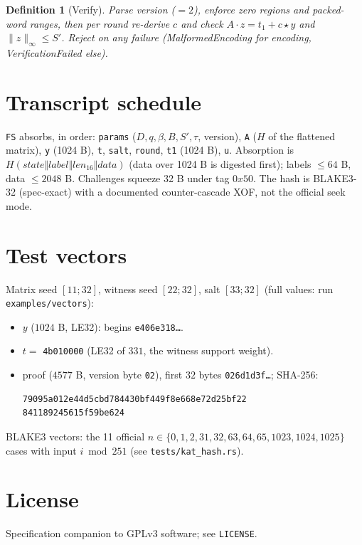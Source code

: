 \documentclass[11pt,a4paper]{article}
\newtheorem{definition}{Definition}[section]
\begin{document}
\begin{definition}[Verify]
Parse version ($=2$), enforce zero regions and packed-word ranges, then per
round re-derive $c$ and check $A\cdot z = t_1 + c\star y$ and
$\lVert z\rVert_\infty \le S'$. Reject on any failure
(\textsf{MalformedEncoding} for encoding, \textsf{VerificationFailed} else).
\end{definition}

\section{Transcript schedule}

\texttt{FS} absorbs, in order: \texttt{params} ($D,q,\beta,B,S',\tau$,
version), \texttt{A} ($H$ of the flattened matrix), \texttt{y} (1024 B),
\texttt{t}, \texttt{salt}, \texttt{round}, \texttt{t1} (1024 B),
\texttt{u}. Absorption is $H(\mathit{state}\Vert\mathit{label}\Vert
\mathit{len}_{16}\Vert\mathit{data})$ (data over 1024 B is digested first);
labels $\le 64$ B, data $\le 2048$ B. Challenges squeeze 32 B under tag
$0x50$. The hash is BLAKE3-32 (spec-exact) with a documented
counter-cascade XOF, not the official seek mode.

\section{Test vectors}

Matrix seed $[11;32]$, witness seed $[22;32]$, salt $[33;32]$
(full values: run \texttt{examples/vectors}):
\begin{itemize}
\item $y$ ($1024$ B, LE32): begins \texttt{e406e318\ldots}.
\item $t = $ \texttt{4b010000} (LE32 of $331$, the witness support weight).
\item proof ($4577$ B, version byte \texttt{02}),
  first $32$ bytes \texttt{026d1d3f\ldots}; SHA-256:
{\footnotesize\begin{verbatim}79095a012e44d5cbd784430bf449f8e668e72d25bf22
841189245615f59be624\end{verbatim}}
\end{itemize}
BLAKE3 vectors: the 11 official $n \in \{0,1,2,31,32,63,64,65,1023,1024,
1025\}$ cases with input $i \bmod 251$ (see \texttt{tests/kat\_hash.rs}).

\section*{License}
Specification companion to GPLv3 software; see \texttt{LICENSE}.
\end{document}

